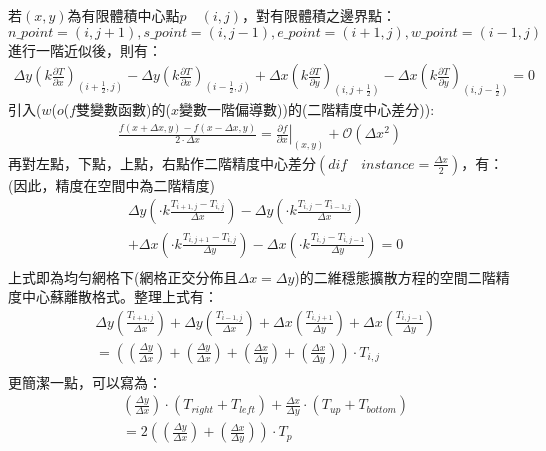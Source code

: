 \documentclass[12pt]{article}
\begin{document}
\noindent 若$(x,y)$為有限體積中心點$p\quad (i,j)$，對有限體積之邊界點：$$n\_point = (i,j+1), s\_point = (i,j-1), e\_point = (i+1,j), w\_point = (i-1,j)$$
進行一階近似後，則有：
\begin{align}
    \Delta y (k \frac{\partial T }{\partial x})_{(i+\frac{1}{2},j)}-\Delta y ( k\frac{\partial T }{\partial x})_{(i-\frac{1}{2},j)} 
    +\Delta x (k \frac{\partial T }{\partial y})_{(i,j+\frac{1}{2})} -\Delta x (k \frac{\partial T }{\partial y})_{(i,j-\frac{1}{2})}
    = 0
\end{align}
\noindent 引入($w$($o$($f$雙變數函數)的($x$變數一階偏導數))的(二階精度中心差分)):
\begin{align}
    \frac{f(x+\Delta x,y)-f(x-\Delta x,y)}{2\cdot \Delta x} = \left.\frac{\partial f }{\partial x} \right|_{(x,y)}+\mathcal{O}(\Delta x^{2})
\end{align}
\noindent 再對左點，下點，上點，右點作二階精度中心差分$(dif\quad instance = \frac{\Delta x}{2})$，有：(因此，精度在空間中為二階精度)
\begin{equation}
    \begin{split}
 &\Delta y (  \cdot k \frac{T_{i+1,j}-T_{i,j}}{\Delta x})- \Delta y (  \cdot k \frac{T_{i,j}-T_{i-1,j}}{\Delta x})\\
 &+ \Delta x (  \cdot k \frac{T_{i,j+1}-T_{i,j}}{\Delta y})- \Delta x (  \cdot k \frac{T_{i,j}-T_{i,j-1}}{\Delta y}) = 0\\
\end{split}
\end{equation}
\noindent 上式即為均勻網格下(網格正交分佈且$\Delta x = \Delta y$)的二維穩態擴散方程的空間二階精度中心蘇離散格式。整理上式有：\\
\begin{equation}
    \begin{split}
 &\Delta y ( \frac{T_{i+1,j}}{\Delta x})+ \Delta y ( \frac{T_{i-1,j}}{\Delta x}) + \Delta x ( \frac{T_{i,j+1}}{\Delta y})+ \Delta x ( \frac{T_{i,j-1}}{\Delta y})\\
 &= (( \frac{\Delta y}{\Delta x})+ ( \frac{\Delta y }{\Delta x}) + ( \frac{\Delta x}{\Delta y})+ ( \frac{\Delta x}{\Delta y}))\cdot T_{i,j}\\
\end{split}
\end{equation}
\noindent 更簡潔一點，可以寫為：
\begin{equation}
    \begin{split}
 &(\frac{\Delta y }{\Delta x})\cdot (T_{right} + T_{left})+  \frac{\Delta x}{\Delta y}\cdot (T_{up} + T_{bottom})\\
 &= 2(( \frac{\Delta y}{\Delta x})+( \frac{\Delta x}{\Delta y}))\cdot T_{p}\\
\end{split}
\end{equation}
\end{document}
